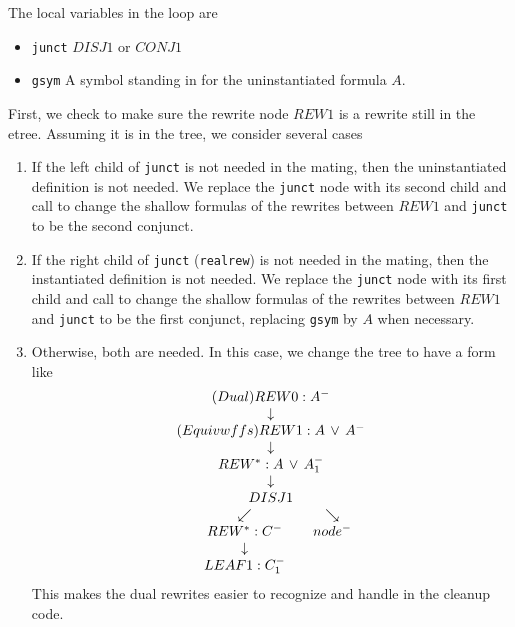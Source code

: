The local variables in the loop are
\begin{itemize}
\item \verb+junct+  $DISJ1$ or $CONJ1$
\item \verb+gsym+  A symbol standing in for the uninstantiated formula $A$.
\end{itemize}

First, we check to make sure the rewrite node $REW1$ is a rewrite
still in the etree.
Assuming it is in the tree, we consider several cases
\begin{enumerate}
\item  If the left child of \verb+junct+ is not needed in
the mating, then the uninstantiated definition is not needed.
We replace the \verb+junct+ node with its second child and
call  to change the shallow formulas
of the rewrites between $REW1$ and \verb+junct+ to be the second conjunct.
\item  If the right child of \verb+junct+ (\verb+realrew+) is not needed in
the mating, then the instantiated definition is not needed.
We replace the \verb+junct+ node with its first child and
call  to change the shallow formulas
of the rewrites between $REW1$ and \verb+junct+ to be the first conjunct,
replacing \verb+gsym+ by $A$ when necessary.
\item  Otherwise, both are needed.  In this case, we change the tree to have
a form like
$$\erew{0}{Dual}{A^-}{\erew{1}{Equivwffs}{A\,\lor\, A^-}{\erewstar{}{A\,\lor\, A_1^-}{\edisj{1}{C \, \land \, D^-}{\erewstar{}{C^-}{\eleaf{1}{C_1^-}}}{node^-}}}}$$
This makes the dual rewrites easier to recognize and handle in the cleanup code.
\end{enumerate}

